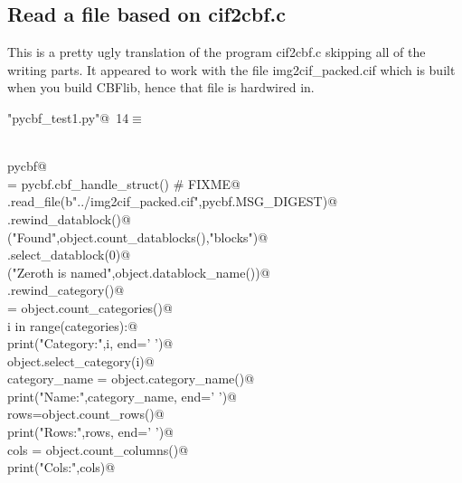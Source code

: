 \documentclass[10pt,a4paper,twoside,notitlepage]{article}
\begin{document}
\subsection{Read a file based on cif2cbf.c}

This is a pretty ugly translation of the program cif2cbf.c skipping
all of the writing parts. 
It appeared to work with the file img2cif\_packed.cif which is built
when you build CBFlib, hence that file is hardwired in.

\begin{flushleft} \small
\begin{minipage}{\linewidth}\label{scrap13}\raggedright\small
{} \verb@"pycbf_test1.py"@\nobreak\ {\footnotesize {14}}$\equiv$
\vspace{-1ex}
\begin{list}{}{} \item
\mbox{}\verb@@\\
\mbox{}\verb@import pycbf@\\
\mbox{}\verb@object = pycbf.cbf_handle_struct() # FIXME@\\
\mbox{}\verb@object.read_file(b"../img2cif_packed.cif",pycbf.MSG_DIGEST)@\\
\mbox{}\verb@object.rewind_datablock()@\\
\mbox{}\verb@print("Found",object.count_datablocks(),"blocks")@\\
\mbox{}\verb@object.select_datablock(0)@\\
\mbox{}\verb@print("Zeroth is named",object.datablock_name())@\\
\mbox{}\verb@object.rewind_category()@\\
\mbox{}\verb@categories = object.count_categories()@\\
\mbox{}\verb@for i in range(categories):@\\
\mbox{}\verb@    print("Category:",i, end=' ')@\\
\mbox{}\verb@    object.select_category(i)@\\
\mbox{}\verb@    category_name = object.category_name()@\\
\mbox{}\verb@    print("Name:",category_name, end=' ')@\\
\mbox{}\verb@    rows=object.count_rows()@\\
\mbox{}\verb@    print("Rows:",rows, end=' ')@\\
\mbox{}\verb@    cols = object.count_columns()@\\
\mbox{}\verb@    print("Cols:",cols)@\\

\end{list}
\end{minipage}
\end{flushleft}
\end{document}

